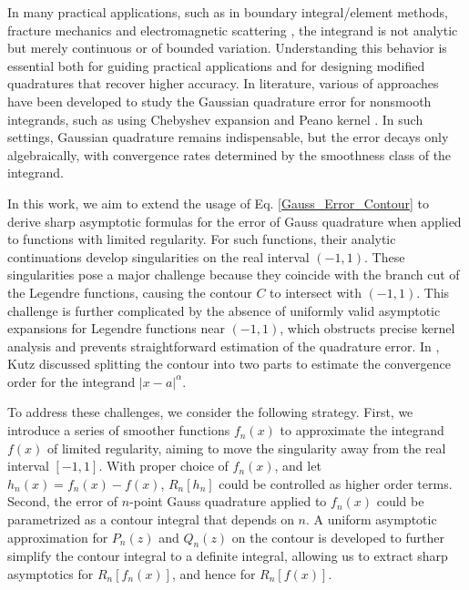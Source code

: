 \documentclass[11pt]{article}
\begin{document}
In many practical applications, such as in boundary integral/element methods, fracture mechanics and electromagnetic scattering \cite{elliott2008clenshaw,huybrechs2009generalized,liang2021high,gupta2022finite,nesvit2014scattering,kayijuka2021fast}, the integrand is not analytic but merely continuous or of bounded variation. Understanding this behavior is essential both for guiding practical applications and for designing modified quadratures that recover higher accuracy. In literature, various of approaches \cite{sidi2011asymptotic,zhao2013sharp,huybrechs2009generalized,diethelm2014error,weideman2019gauss,kazashi2023suboptimality,goda2024sharp,trefethen2022exactness} have been developed to study the Gaussian quadrature error for nonsmooth integrands, such as using Chebyshev expansion \cite{curtis1972gaussian, riess1971error, trefethen2008gauss, trefethen2019approximation, xiang2012convergence, xiang2012error, xiang2016improved} and Peano kernel \cite{brass1997gaussian,petras1993asymptotics,brass2011quadrature,forster1991error,diethelm1996peano}. In such settings, Gaussian quadrature remains indispensable, but the error decays only algebraically, with convergence rates determined by the smoothness class of the integrand.


In this work, we aim to extend the usage of Eq. \eqref{Gauss_Error_Contour} to derive sharp asymptotic formulas for the error of Gauss quadrature when applied to functions with limited regularity. For such functions, their analytic continuations develop singularities on the real interval $(-1,1)$. These singularities pose a major challenge because they coincide with the branch cut of the Legendre functions, causing the contour $C$ to intersect with $(-1,1)$. This challenge is further complicated by the absence of uniformly valid asymptotic expansions for Legendre functions near $(-1,1)$, which obstructs precise kernel analysis and prevents straightforward estimation of the quadrature error. In \cite{kutz1984asymptotic}, Kutz discussed splitting the contour into two parts to estimate the convergence order for the integrand $|x-a|^\alpha$.

To address these challenges, we  consider the following strategy. First, we introduce a series of smoother functions $f_n(x)$ to approximate the integrand $f(x)$ of limited regularity, aiming to move the singularity away from the real interval $[-1,1]$. With proper choice of $f_n(x)$, and let $h_n(x)=f_n(x)-f(x)$, $R_n[h_n]$ could be controlled as higher order terms. Second, the error of $n$-point Gauss quadrature applied to $f_n(x)$ could be parametrized as a contour integral that depends on $n$. A uniform asymptotic approximation for $P_n(z)$ and $Q_n(z)$ on the contour is developed to further simplify the contour integral to a definite integral, allowing us to extract sharp asymptotics for $R_n[f_n(x)]$, and hence for $R_n[f(x)]$.
\end{document}
